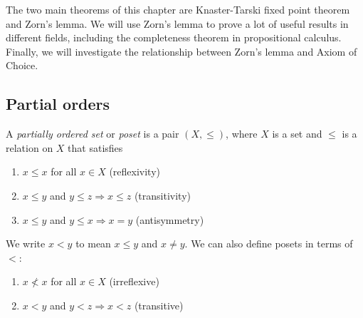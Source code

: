 \documentclass[a4paper]{article}
\begin{document}
The two main theorems of this chapter are Knaster-Tarski fixed point theorem and Zorn's lemma. We will use Zorn's lemma to prove a lot of useful results in different fields, including the completeness theorem in propositional calculus. Finally, we will investigate the relationship between Zorn's lemma and Axiom of Choice.

\subsection{Partial orders}
\begin{defi}
  A \emph{partially ordered set} or \emph{poset} is a pair $(X, \leq)$, where $X$ is a set and $\leq$ is a relation on $X$ that satisfies
  \begin{enumerate}
    \item $x\leq x$ for all $x\in X$ \hfill (reflexivity)
    \item $x \leq y$ and $y \leq z \Rightarrow x \leq z$ \hfill (transitivity)
    \item $x \leq y$ and $y \leq x \Rightarrow x = y$ \hfill (antisymmetry)
  \end{enumerate}
  We write $x < y$ to mean $ x\leq y$ and $x\not= y$. We can also define posets in terms of~$<$:
  \begin{enumerate}
    \item $x \not< x$ for all $x\in X$ \hfill (irreflexive)
    \item $x < y$ and $y < z\Rightarrow x < z$ \hfill (transitive)
  \end{enumerate}
\end{defi}
\end{document}
